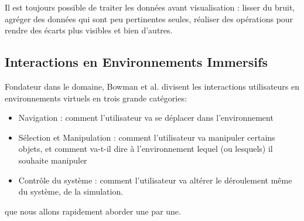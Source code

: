 	Il est toujours possible de traiter les données avant visualisation : lisser du bruit, agréger des données qui sont peu pertinentes seules, réaliser des opérations pour rendre des écarts plus visibles et bien d'autres.
	
	\subsection{Interactions en Environnements Immersifs}
	
	Fondateur dans le domaine, Bowman et al. \cite{bowman_introduction_2001} divisent les interactions utilisateurs en environnements virtuels en trois grande catégories:
	\begin{itemize}
		\item Navigation : comment l'utilisateur va se déplacer dans l'environnement
		\item Sélection et Manipulation : comment l'utilisateur va manipuler certains objets, et comment va-t-il dire à l'environnement lequel (ou lesquels) il souhaite manipuler
		\item Contrôle du système : comment l'utilisateur va altérer le déroulement même du système, de la simulation.
	\end{itemize}
	que nous allons rapidement aborder une par une.
	
